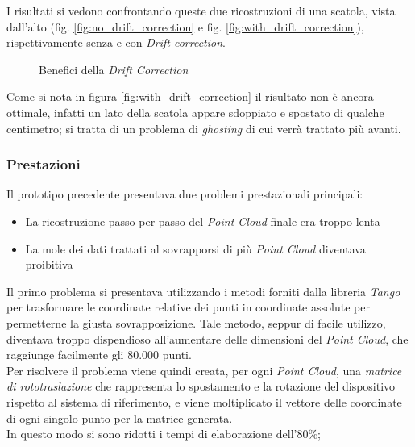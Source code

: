 I risultati si vedono confrontando queste due ricostruzioni di una scatola, vista dall'alto (fig. \ref{fig:no_drift_correction} e fig. \ref{fig:with_drift_correction}), rispettivamente senza e con \emph{Drift correction}.
\begin{figure}[htp] 
    \centering
    \hfill%
    \caption{Benefici della \emph{Drift Correction}}
\end{figure}
\newline
Come si nota in figura \ref{fig:with_drift_correction} il risultato non è ancora ottimale, infatti un lato della scatola appare sdoppiato e spostato di qualche centimetro; si tratta di un problema di \emph{ghosting} di cui verrà trattato più avanti.

\subsubsection{Prestazioni}
Il prototipo precedente presentava due problemi prestazionali principali:
\begin{itemize}
\item La ricostruzione passo per passo del \emph{Point Cloud} finale era troppo lenta
\item La mole dei dati trattati al sovrapporsi di più \emph{Point Cloud} diventava proibitiva
\end{itemize}
\noindent
Il primo problema si presentava utilizzando i metodi forniti dalla libreria \emph{Tango} per trasformare le coordinate relative dei punti in coordinate assolute per permetterne la giusta sovrapposizione. Tale metodo, seppur di facile utilizzo, diventava troppo dispendioso all'aumentare delle dimensioni del \emph{Point Cloud}, che raggiunge facilmente gli 80.000 punti.\\
Per risolvere il problema viene quindi creata, per ogni \emph{Point Cloud}, una \emph{matrice di rototraslazione} che rappresenta lo spostamento e la rotazione del dispositivo rispetto al sistema di riferimento, e viene moltiplicato il vettore delle coordinate di ogni singolo punto per la matrice generata. \\
In questo modo si sono ridotti i tempi di elaborazione dell'80\%;
\newline

